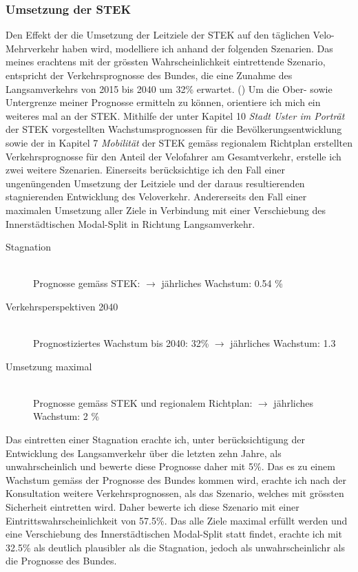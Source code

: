 \newpage


\subsubsection*{Umsetzung der STEK}
\label{subsubsec:Umsetzung}


Den Effekt der die Umsetzung der Leitziele der STEK auf den täglichen Velo-Mehrverkehr haben wird, modelliere ich anhand der folgenden Szenarien. Das meines erachtens mit der grössten Wahrscheinlichkeit eintrettende Szenario, entspricht der Verkehrsprognosse des Bundes, die eine Zunahme des Langsamverkehrs von 2015 bis 2040 um 32\% erwartet. (\cite{Perspektive2040}) 
Um die Ober- sowie Untergrenze meiner Prognosse ermitteln zu können, orientiere ich mich ein weiteres mal an der STEK. Mithilfe der unter Kapitel 10 \textit{Stadt Uster im Porträt} der STEK vorgestellten Wachstumsprognossen für die Bevölkerungsentwicklung sowie der in Kapitel 7 \textit{Mobilität} der STEK gemäss regionalem Richtplan erstellten Verkehrsprognosse für den Anteil der Velofahrer am Gesamtverkehr, erstelle ich zwei weitere Szenarien. 
Einerseits berücksichtige ich den Fall einer ungenüngenden Umsetzung der Leitziele und der daraus resultierenden stagnierenden Entwicklung des Veloverkehr. Andererseits den Fall einer maximalen Umsetzung aller Ziele in Verbindung mit einer Verschiebung des Innerstädtischen Modal-Split in Richtung Langsamverkehr.

\begin{description}
\item[Stagnation] \hfill \\
Prognosse gemäss STEK: $\rightarrow$ jährliches Wachstum: 0.54 \% 
\item[Verkehrsperspektiven 2040] \hfill \\
Prognostiziertes Wachstum bis 2040: 32\% $\rightarrow$ jährliches Wachstum: 1.3 
\item[Umsetzung maximal] \hfill \\
Prognosse gemäss STEK und regionalem Richtplan: $\rightarrow$ jährliches Wachstum: 2 \% 
\end{description}

Das eintretten einer Stagnation erachte ich, unter berücksichtigung der Entwicklung des Langsamverkehr über die letzten zehn Jahre, als unwahrscheinlich und bewerte diese Prognosse daher mit 5\%.
Das es zu einem Wachstum gemäss der Prognosse des Bundes kommen wird, erachte ich nach der Konsultation weitere Verkehrsprognossen, als das Szenario, welches mit grössten Sicherheit eintretten wird. Daher bewerte ich diese Szenario mit einer Eintrittswahrscheinlichkeit von 57.5\%. 
Das alle Ziele maximal erfüllt werden und eine Verschiebung des Innerstädtischen Modal-Split statt findet, erachte ich mit 32.5\% als deutlich plausibler als die Stagnation, jedoch als unwahrscheinlichr als die Prognosse des Bundes. 

